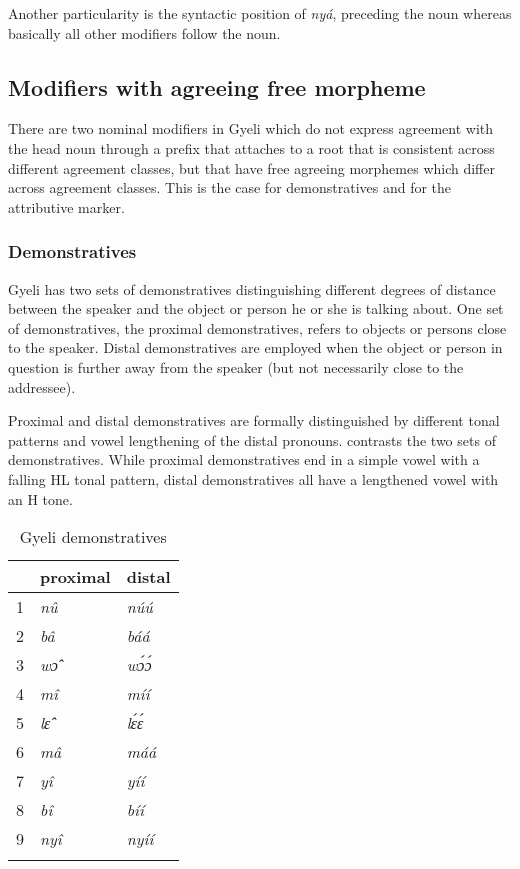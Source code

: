 \noindent Another particularity is the syntactic position of {\itshape nyá}, preceding the noun where\-as basically all other modifiers follow the noun.


\subsection{Modifiers with agreeing free morpheme}
\label{sec:MODAgrForm}

There are two nominal modifiers in Gyeli which do not express agreement with the head noun through a prefix that attaches to a root that is consistent across different agreement classes, but that have free agreeing morphemes which differ across agreement classes. This is the case for demonstratives and for the attributive marker.
		
		

\subsubsection{Demonstratives}
\label{sec:DEM}



Gyeli has two sets of demonstratives distinguishing different degrees of distance between the speaker and the object or person he or she is talking about. One set of demonstratives, the proximal demonstratives, refers to objects or persons close to the speaker. Distal demonstratives are employed when the object or person in question is further away from the speaker (but not necessarily close to the addressee). 

Proximal and distal demonstratives are formally distinguished by different tonal patterns and vowel lengthening of the distal pronouns.  contrasts the two sets of demonstratives. While proximal demonstratives end in a simple vowel with a falling HL tonal pattern, distal demonstratives all have a lengthened vowel with an H tone.

\begin{table}
\begin{tabular}{lll}
 \lsptoprule
 & proximal & distal \\
  \midrule
 1 & \itshape{nû} & \itshape{núú} \\
 2 & \itshape{bâ} & \itshape{báá} \\
 3 & \itshape{wɔ̂} & \itshape{wɔ́ɔ́} \\
4 & \itshape{mî} & \itshape{míí} \\
5 & \itshape{lɛ̂} & \itshape{lɛ́ɛ́} \\
6 & \itshape{mâ} & \itshape{máá} \\
7 & \itshape{yî} & \itshape{yíí} \\
8 & \itshape{bî} & \itshape{bíí} \\
9 & \itshape{nyî} & \itshape{nyíí} \\
  \lspbottomrule
\end{tabular}
\caption{Gyeli demonstratives}
\label{Tab:dem}
\end{table}

